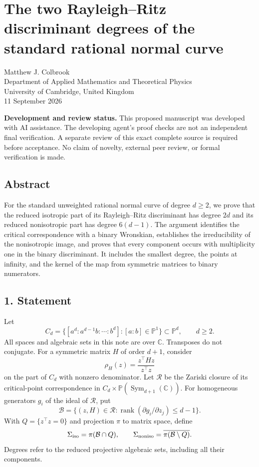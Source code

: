 \documentclass[
  11pt,
]{article}
\author{Matthew J. Colbrook}
\date{}
\begin{document}
\section{The two Rayleigh--Ritz discriminant degrees of the standard
rational normal
curve}\label{the-two-rayleighritz-discriminant-degrees-of-the-standard-rational-normal-curve}

Matthew J. Colbrook\\
Department of Applied Mathematics and Theoretical Physics\\
University of Cambridge, United Kingdom\\
11 September 2026

\textbf{Development and review status.} This proposed manuscript was
developed with AI assistance. The developing agent's proof checks are
not an independent final verification. A separate review of this exact
complete source is required before acceptance. No claim of novelty,
external peer review, or formal verification is made.

\subsection{Abstract}\label{abstract}

For the standard unweighted rational normal curve of degree \(d\ge2\),
we prove that the reduced isotropic part of its Rayleigh--Ritz
discriminant has degree \(2d\) and its reduced nonisotropic part has
degree \(6(d-1)\). The argument identifies the critical correspondence
with a binary Wronskian, establishes the irreducibility of the
nonisotropic image, and proves that every component occurs with
multiplicity one in the binary discriminant. It includes the smallest
degree, the points at infinity, and the kernel of the map from symmetric
matrices to binary numerators.

\subsection{1. Statement}\label{statement}

Let \[
 C_d=\{[a^d:a^{d-1}b:\cdots:b^d]:[a:b]\in\mathbb P^1\}
 \subset\mathbb P^d,\qquad d\ge2.
\] All spaces and algebraic sets in this note are over \(\mathbb C\).
Transposes do not conjugate. For a symmetric matrix \(H\) of order
\(d+1\), consider \[
 \rho_H(z)=\frac{z^\top Hz}{z^\top z}
\] on the part of \(C_d\) with nonzero denominator. Let \(\mathcal R\)
be the Zariski closure of its critical-point correspondence in
\(C_d\times\mathbb P(\operatorname{Sym}_{d+1}(\mathbb C))\). For
homogeneous generators \(g_i\) of the ideal of \(\mathcal R\), put \[
 \mathcal B=\{(z,H)\in\mathcal R:
       \operatorname{rank}(\partial g_i/\partial z_j)\le d-1\}.
\] With \(Q=\{z^\top z=0\}\) and projection \(\pi\) to matrix space,
define \[
 \Sigma_{\rm iso}=\pi(\mathcal B\cap Q),\qquad
 \Sigma_{\rm noniso}=\overline{\pi(\mathcal B\setminus Q)}.
\] Degrees refer to the reduced projective algebraic sets, including all
their components.
\end{document}
